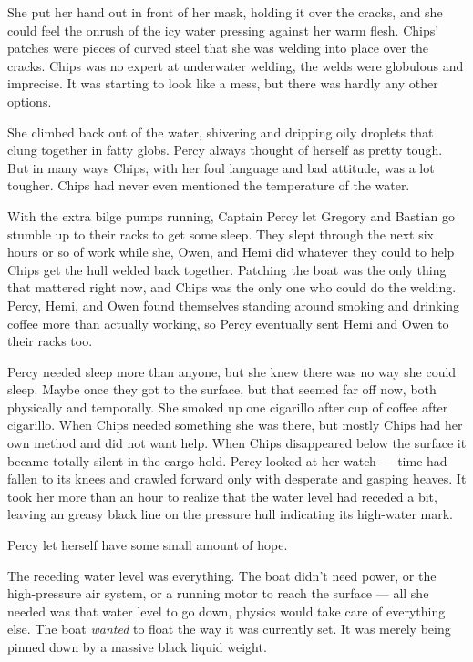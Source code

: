 \documentclass[
]{scrbook}
\begin{document}
She put her hand out in front of her mask, holding it over the cracks,
and she could feel the onrush of the icy water pressing against her warm
flesh. Chips' patches were pieces of curved steel that she was welding
into place over the cracks. Chips was no expert at underwater welding,
the welds were globulous and imprecise. It was starting to look like a
mess, but there was hardly any other options.

She climbed back out of the water, shivering and dripping oily droplets
that clung together in fatty globs. Percy always thought of herself as
pretty tough. But in many ways Chips, with her foul language and bad
attitude, was a lot tougher. Chips had never even mentioned the
temperature of the water.

With the extra bilge pumps running, Captain Percy let Gregory and
Bastian go stumble up to their racks to get some sleep. They slept
through the next six hours or so of work while she, Owen, and Hemi did
whatever they could to help Chips get the hull welded back together.
Patching the boat was the only thing that mattered right now, and Chips
was the only one who could do the welding. Percy, Hemi, and Owen found
themselves standing around smoking and drinking coffee more than
actually working, so Percy eventually sent Hemi and Owen to their racks
too.

Percy needed sleep more than anyone, but she knew there was no way she
could sleep. Maybe once they got to the surface, but that seemed far off
now, both physically and temporally. She smoked up one cigarillo after
cup of coffee after cigarillo. When Chips needed something she was
there, but mostly Chips had her own method and did not want help. When
Chips disappeared below the surface it became totally silent in the
cargo hold. Percy looked at her watch --- time had fallen to its knees
and crawled forward only with desperate and gasping heaves. It took her
more than an hour to realize that the water level had receded a bit,
leaving an greasy black line on the pressure hull indicating its
high-water mark.

Percy let herself have some small amount of hope.

The receding water level was everything. The boat didn't need power, or
the high-pressure air system, or a running motor to reach the surface
--- all she needed was that water level to go down, physics would take
care of everything else. The boat \emph{wanted} to float the way it was
currently set. It was merely being pinned down by a massive black liquid
weight.
\end{document}
